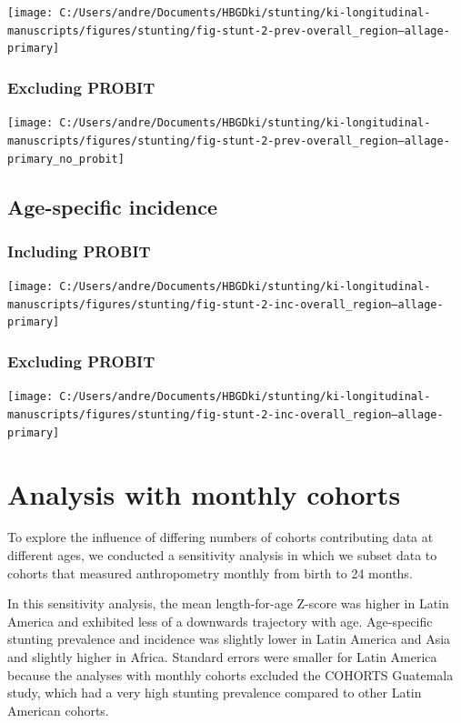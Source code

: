 \documentclass[
  9pt,
]{book}
\begin{document}
\texttt{[image: C:/Users/andre/Documents/HBGDki/stunting/ki-longitudinal-manuscripts/figures/stunting/fig-stunt-2-prev-overall\_region--allage-primary]}

\hypertarget{excluding-probit-1}{%
\subsection{Excluding PROBIT}\label{excluding-probit-1}}

\texttt{[image: C:/Users/andre/Documents/HBGDki/stunting/ki-longitudinal-manuscripts/figures/stunting/fig-stunt-2-prev-overall\_region--allage-primary\_no\_probit]}

\hypertarget{age-specific-incidence-1}{%
\section{Age-specific incidence}\label{age-specific-incidence-1}}

\hypertarget{including-probit-2}{%
\subsection{Including PROBIT}\label{including-probit-2}}

\texttt{[image: C:/Users/andre/Documents/HBGDki/stunting/ki-longitudinal-manuscripts/figures/stunting/fig-stunt-2-inc-overall\_region--allage-primary]}

\hypertarget{excluding-probit-2}{%
\subsection{Excluding PROBIT}\label{excluding-probit-2}}

\texttt{[image: C:/Users/andre/Documents/HBGDki/stunting/ki-longitudinal-manuscripts/figures/stunting/fig-stunt-2-inc-overall\_region--allage-primary]}

\hypertarget{monthly}{%
\chapter{Analysis with monthly cohorts}\label{monthly}}

\raggedright

To explore the influence of differing numbers of cohorts contributing data at different ages, we conducted a sensitivity analysis in which we subset data to cohorts that measured anthropometry monthly from birth to 24 months.

In this sensitivity analysis, the mean length-for-age Z-score was higher in Latin America and exhibited less of a downwards trajectory with age. Age-specific stunting prevalence and incidence was slightly lower in Latin America and Asia and slightly higher in Africa. Standard errors were smaller for Latin America because the analyses with monthly cohorts excluded the COHORTS Guatemala study, which had a very high stunting prevalence compared to other Latin American cohorts.
\end{document}
